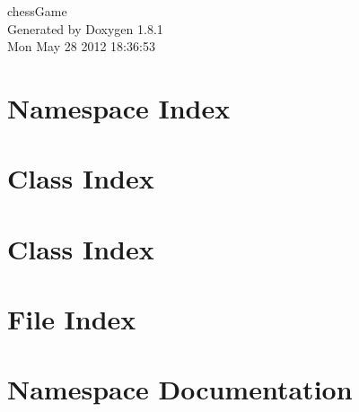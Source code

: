 \documentclass{book}
\begin{document}
\begin{titlepage}
\vspace*{7cm}
\begin{center}
{\Large chess\-Game }\\
\vspace*{1cm}
{\large Generated by Doxygen 1.8.1}\\
\vspace*{0.5cm}
{\small Mon May 28 2012 18:36:53}\\
\end{center}
\end{titlepage}
\clearemptydoublepage
{}
\tableofcontents
\clearemptydoublepage
{}
\chapter{Namespace Index}

\chapter{Class Index}

\chapter{Class Index}

\chapter{File Index}

\chapter{Namespace Documentation}









\end{document}
